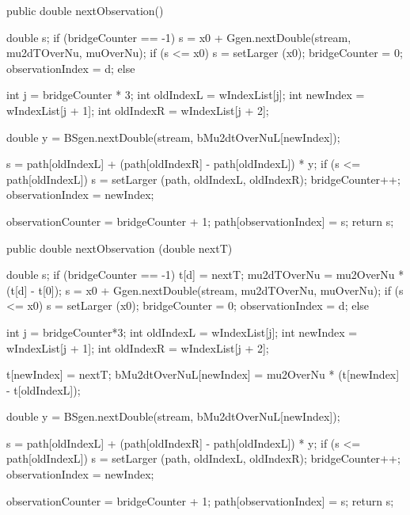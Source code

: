 \begin{code} \begin{hide}

    public double nextObservation()  {
      double s;
      if (bridgeCounter == -1) {
         s = x0 + Ggen.nextDouble(stream, mu2dTOverNu, muOverNu);
         if (s <= x0)
              s = setLarger (x0);
         bridgeCounter = 0;
         observationIndex = d;
      } else {
         int j = bridgeCounter * 3;
         int oldIndexL = wIndexList[j];
         int newIndex = wIndexList[j + 1];
         int oldIndexR = wIndexList[j + 2];

         double y = BSgen.nextDouble(stream, bMu2dtOverNuL[newIndex]);

         s = path[oldIndexL] + (path[oldIndexR] - path[oldIndexL]) * y;
         if (s <= path[oldIndexL])
             s = setLarger (path, oldIndexL, oldIndexR);
         bridgeCounter++;
         observationIndex = newIndex;
      }
      observationCounter = bridgeCounter + 1;
      path[observationIndex] = s;
      return s;
    }

    public double nextObservation (double nextT) {
        double s;
        if (bridgeCounter == -1) {
            t[d] = nextT;
            mu2dTOverNu = mu2OverNu * (t[d] - t[0]);
            s = x0 + Ggen.nextDouble(stream, mu2dTOverNu, muOverNu);
            if (s <= x0)
               s = setLarger (x0);
            bridgeCounter    = 0;
            observationIndex = d;
        } else {
            int j = bridgeCounter*3;
            int oldIndexL = wIndexList[j];
            int newIndex  = wIndexList[j + 1];
            int oldIndexR = wIndexList[j + 2];

            t[newIndex] = nextT;
            bMu2dtOverNuL[newIndex] = mu2OverNu
                                      * (t[newIndex] - t[oldIndexL]);

            double y =  BSgen.nextDouble(stream, bMu2dtOverNuL[newIndex]);

            s = path[oldIndexL] + (path[oldIndexR] - path[oldIndexL]) * y;
            if (s <= path[oldIndexL])
                s = setLarger (path, oldIndexL, oldIndexR);
            bridgeCounter++;
            observationIndex = newIndex;
        }
        observationCounter = bridgeCounter + 1;
        path[observationIndex] = s;
        return s;
    }


\end{hide}
\end{code}
